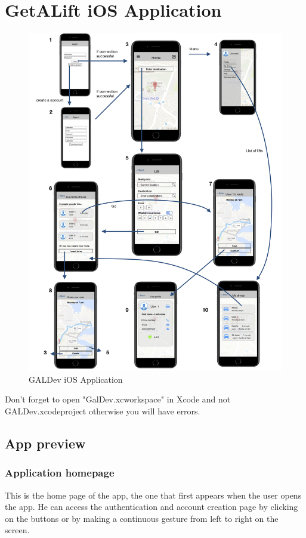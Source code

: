 \section{GetALift iOS Application}

\begin{figure}[h!]
\begin{center}
\includegraphics[scale = 0.35]{diagrams/iOSApplication.png} 
\end{center}
\caption{GALDev iOS Application}
\end{figure}

Don't forget to open "GalDev.xcworkspace" in Xcode and not GALDev.xcodeproject otherwise you will have errors.

\subsection{App preview}

\subsubsection{Application homepage}
This is the home page of the app, the one that first appears when the user opens the app. He can access the authentication and account creation page by clicking on the buttons or by making a continuous gesture from left to right on the screen.

